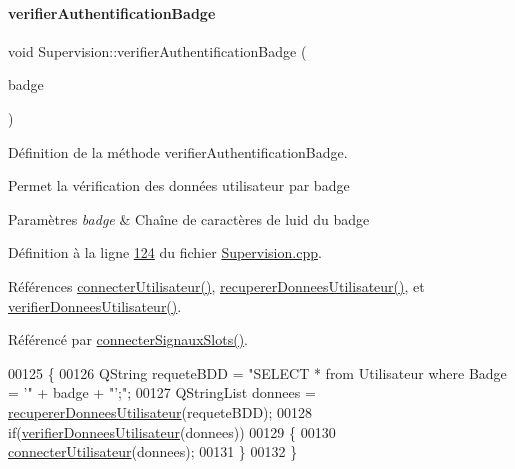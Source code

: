 \mbox{\label{class_supervision_a07e7f0cd8b114182be56ebb5645e62fe}} 
\paragraph{\texorpdfstring{verifier\+Authentification\+Badge}{verifierAuthentificationBadge}}
{\footnotesize\ttfamily void Supervision\+::verifier\+Authentification\+Badge (\begin{DoxyParamCaption}\item[{Q\+String}]{badge }\end{DoxyParamCaption})\hspace{0.3cm}{\ttfamily [slot]}}



Définition de la méthode verifier\+Authentification\+Badge. 

Permet la vérification des données utilisateur par badge 
\begin{DoxyParams}{Paramètres}
{\em badge} & Chaîne de caractères de l\textquotesingle{}uid du badge \\
\hline
\end{DoxyParams}


Définition à la ligne \hyperlink{_supervision_8cpp_source_l00124}{124} du fichier \hyperlink{_supervision_8cpp_source}{Supervision.\+cpp}.



Références \hyperlink{_supervision_8cpp_source_l00256}{connecter\+Utilisateur()}, \hyperlink{_supervision_8cpp_source_l00165}{recuperer\+Donnees\+Utilisateur()}, et \hyperlink{_supervision_8cpp_source_l00224}{verifier\+Donnees\+Utilisateur()}.



Référencé par \hyperlink{_supervision_8cpp_source_l00273}{connecter\+Signaux\+Slots()}.


\begin{DoxyCode}
00125 \{
00126     QString requeteBDD = \textcolor{stringliteral}{"SELECT * from Utilisateur where Badge = '"} + badge + \textcolor{stringliteral}{"';"};
00127     QStringList donnees = \hyperlink{class_supervision_a137b6c505742a4ada6ab38193eef01dd}{recupererDonneesUtilisateur}(requeteBDD);
00128     \textcolor{keywordflow}{if}(\hyperlink{class_supervision_ae3400dad53c52bc09198e8d7f80e0e67}{verifierDonneesUtilisateur}(donnees))
00129     \{
00130         \hyperlink{class_supervision_a7c397ca5f79afa2709a657d7185dfbe1}{connecterUtilisateur}(donnees);
00131     \}
00132 \}
\end{DoxyCode}
\mbox{\label{class_supervision_ac596674d302f1f747d65c8334aa1ced9}} 

